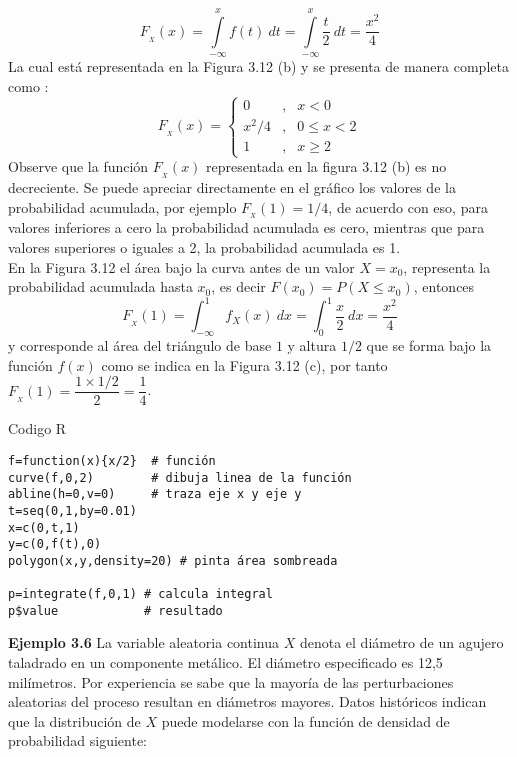 \documentclass[base=hide,12pt]{elegantbook}
\begin{document}
%
\[F_{_X}(x)=\int \limits_{-\infty}^{x}f(t)\:dt=\int \limits_{-\infty}^{x}\frac{t}{2}\:dt=\frac{x^{2}}{4}\]
La cual está representada en  la Figura 3.12 (b) y se presenta de manera completa como : 
%	
\begin{equation*}
	F_{_X}(x)=\left\lbrace
	\begin{array}{lcl}
		0  &,&  x<0 \\
		x^{2}/4&, & 0\leq x < 2 \\
		1 &,& x \geq 2
	\end{array}
	\right.
\end{equation*}
%	
Observe  que la función $F_{_{X}}(x)$ representada en la figura 3.12 (b) es no decreciente. Se puede apreciar directamente en el gráfico los valores de la probabilidad acumulada, por ejemplo $F_{_X}(1)= 1/4$, de acuerdo con eso, para valores inferiores a cero la probabilidad acumulada es cero, mientras que para valores superiores  o iguales a 2, la probabilidad acumulada es 1.\\
%	
%
%	
En la Figura 3.12  el área bajo la curva  antes de un valor $X=x_0$, representa la probabilidad acumulada hasta $x_0$, es decir  $F(x_0)=P(X \leq x_0)$, entonces
%	
\[F_{_X}(1)=\int_{-\infty}^{1} f_{X}(x)\: dx = \int_{0}^{1} \dfrac{x}{2}\: dx = \dfrac{x^{2}}{4}\]
%	
y corresponde al área del triángulo de base $1$ y altura $1/2$ que se forma bajo la función $f(x)$ como se indica en  la Figura 3.12 (c), por tanto $F_{_X}(1)=\dfrac{1 \times 1/2 }{2}=\dfrac{1}{4}$.\\
\begin{Box3}{Codigo R}
{\small 
\begin{verbatim}
f=function(x){x/2}  # función
curve(f,0,2)        # dibuja linea de la función
abline(h=0,v=0)     # traza eje x y eje y
t=seq(0,1,by=0.01)  
x=c(0,t,1)
y=c(0,f(t),0)
polygon(x,y,density=20) # pinta área sombreada
	
p=integrate(f,0,1) # calcula integral
p$value            # resultado
\end{verbatim}
}
\end{Box3}
\vspace{.5cm}	
\textcolor{col3}{\bf Ejemplo 3.6 }
La variable aleatoria continua $X$ denota el diámetro de un agujero taladrado en un componente metálico. El diámetro especificado es 12,5 milímetros. Por experiencia se sabe que la mayoría de las perturbaciones aleatorias del proceso resultan en diámetros mayores. Datos históricos indican que la distribución de $X$ puede modelarse con la función de densidad de probabilidad siguiente: \\
	
\end{document}
